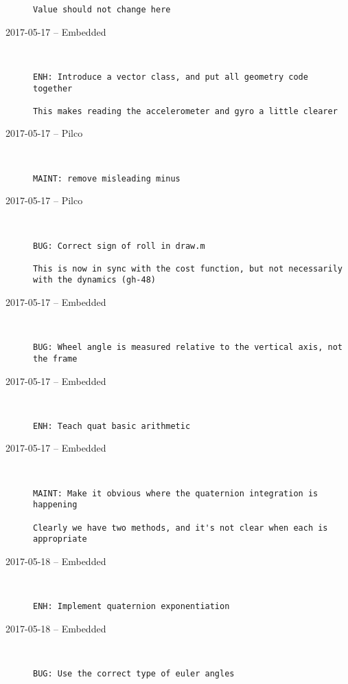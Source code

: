 \begin{description}
\begin{lstlisting}
Value should not change here
\end{lstlisting}


  \item[2017-05-17 -- Embedded] \hfill \
\begin{lstlisting}
ENH: Introduce a vector class, and put all geometry code together

This makes reading the accelerometer and gyro a little clearer
\end{lstlisting}


  \item[2017-05-17 -- Pilco] \hfill \
\begin{lstlisting}
MAINT: remove misleading minus
\end{lstlisting}


  \item[2017-05-17 -- Pilco] \hfill \
\begin{lstlisting}
BUG: Correct sign of roll in draw.m

This is now in sync with the cost function, but not necessarily with the dynamics (gh-48)
\end{lstlisting}


  \item[2017-05-17 -- Embedded] \hfill \
\begin{lstlisting}
BUG: Wheel angle is measured relative to the vertical axis, not the frame
\end{lstlisting}


  \item[2017-05-17 -- Embedded] \hfill \
\begin{lstlisting}
ENH: Teach quat basic arithmetic
\end{lstlisting}


  \item[2017-05-17 -- Embedded] \hfill \
\begin{lstlisting}
MAINT: Make it obvious where the quaternion integration is happening

Clearly we have two methods, and it's not clear when each is appropriate
\end{lstlisting}


  \item[2017-05-18 -- Embedded] \hfill \
\begin{lstlisting}
ENH: Implement quaternion exponentiation
\end{lstlisting}


  \item[2017-05-18 -- Embedded] \hfill \
\begin{lstlisting}
BUG: Use the correct type of euler angles


\end{lstlisting}
\end{description}
